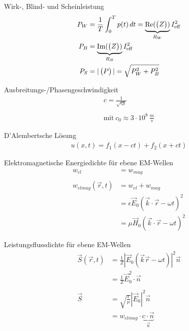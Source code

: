 \documentclass[a6paper]{kartei}
\DeclareMathOperator{\re}{Re}
\DeclareMathOperator{\im}{Im}
\begin{document}
\begin{karte}{Wirk-, Blind- und Scheinleistung}
\begin{align}
 P_{W} & = \frac{1}{T} \int_{0}^{T} p(t) \, dt = \underbrace{\re (\vect{Z})}_{R_{W}} I_{\text{eff}}^{2} \\
 P_{B} & = \underbrace{\im(\vect{Z})}_{R_{B}}  I_{\text{eff}}^{2} \\
 P_{S} & = |\vect{P}| = \sqrt{P_{W}^{2}+P_{B}^{2}}
\end{align}
\end{karte}

\begin{karte}{Ausbreitungs-/Phasengeschwindigkeit}
\begin{eqnarray*}
c = \frac{1}{\sqrt{\epsilon \mu}} \\
\nonumber \\
\text{mit} \ c_{0} \approx 3 \cdot 10^{8} \, \frac{m}{s} \nonumber
\end{eqnarray*}
\end{karte}

\begin{karte}{D'Alembertsche Lösung}
\begin{eqnarray*}
u(x,t) = f_{1}(x-ct) + f_{2}(x+ct)
\end{eqnarray*}
\end{karte}


\begin{karte}{Elektromagnetische Energiedichte für ebene EM-Wellen}
\begin{align}
w_{el} &= w_{mag} \nonumber \\
\nonumber \\
w_{elmag}(\vec{r},t) & = w_{el} + w_{mag} \nonumber \\
&= \epsilon \vec{E}_{0}(\vec{k} \cdot \vec{r} - \omega t)^2 \nonumber \\ & = \mu \vec{H}_{0}(\vec{k} \cdot \vec{r} - \omega t)^2
\end{align}
\end{karte}

\begin{karte}{Leistungsflussdichte für ebene EM-Wellen}
\begin{align}
\vec{S}(\vec{r},t) & = \frac{1}{Z} |\vec{E}_{0}(\vec{k}\vec{r}- \omega t)|^{2} \vec{n} \\
& = \frac{1}{Z} \vec{E}_{0}^{2} \cdot \vec{n} \nonumber \\
\nonumber \\
\vec{S} & = \sqrt{\frac{\epsilon}{\mu}} |\vec{E}_{0}|^{2} \vec{n} \\ & = w_{elmag} \cdot \underbrace{c \cdot \vec{n}}_{\vec{u}} \nonumber
\end{align}
\end{karte}
\end{document}
